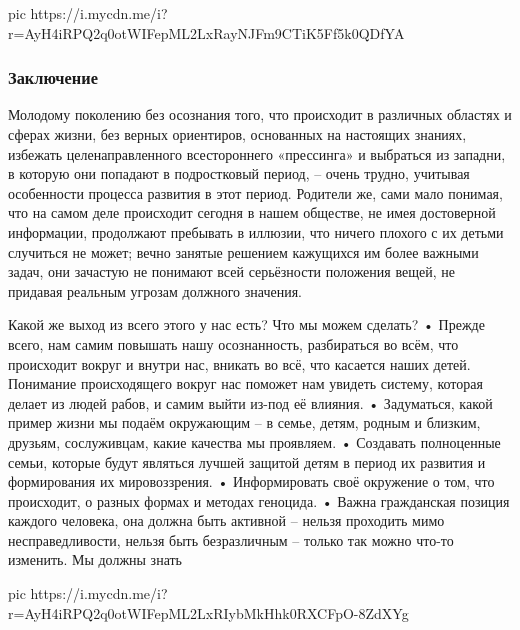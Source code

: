 \ifcmt
pic https://i.mycdn.me/i?r=AyH4iRPQ2q0otWIFepML2LxRayNJFm9CTiK5Ff5k0QDfYA
\fi

\subsubsection{Заключение}

Молодому поколению без осознания того, что происходит в различных областях и
сферах жизни, без верных ориентиров, основанных на настоящих знаниях, избежать
целенаправленного всестороннего «прессинга» и выбраться из западни, в которую
они попадают в подростковый период, – очень трудно, учитывая особенности
процесса развития в этот период. Родители же, сами мало понимая, что на самом
деле происходит сегодня в нашем обществе, не имея достоверной информации,
продолжают пребывать в иллюзии, что ничего плохого с их детьми случиться не
может; вечно занятые решением кажущихся им более важными задач, они зачастую не
понимают всей серьёзности положения вещей, не придавая реальным угрозам
должного значения. 

Какой же выход из всего этого у нас есть? Что мы можем сделать? • Прежде всего,
нам самим повышать нашу осознанность, разбираться во всём, что происходит
вокруг и внутри нас, вникать во всё, что касается наших детей. Понимание
происходящего вокруг нас поможет нам увидеть систему, которая делает из людей
рабов, и самим выйти из-под её влияния. • Задуматься, какой пример жизни мы
подаём окружающим – в семье, детям, родным и близким, друзьям, сослуживцам,
какие качества мы проявляем. • Создавать полноценные семьи, которые будут
являться лучшей защитой детям в период их развития и формирования их
мировоззрения. • Информировать своё окружение о том, что происходит, о разных
формах и методах геноцида. • Важна гражданская позиция каждого человека, она
должна быть активной – нельзя проходить мимо несправедливости, нельзя быть
безразличным – только так можно что-то изменить. Мы должны знать

\ifcmt
pic https://i.mycdn.me/i?r=AyH4iRPQ2q0otWIFepML2LxRIybMkHhk0RXCFpO-8ZdXYg
\fi
